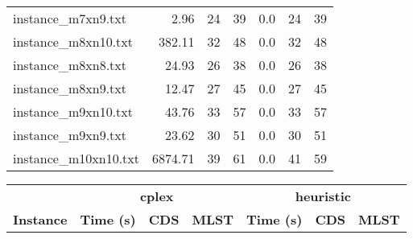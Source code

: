 \documentclass{article}
\begin{document}
\begin{center}
\begin{tabular}{lrrrrrr}
instance\_m7xn9.txt & 2.96 & 24 & 39
 & 0.0 & 24 & 39
\\
instance\_m8xn10.txt & 382.11 & 32 & 48
 & 0.0 & 32 & 48
\\
instance\_m8xn8.txt & 24.93 & 26 & 38
 & 0.0 & 26 & 38
\\
instance\_m8xn9.txt & 12.47 & 27 & 45
 & 0.0 & 27 & 45
\\
instance\_m9xn10.txt & 43.76 & 33 & 57
 & 0.0 & 33 & 57
\\
instance\_m9xn9.txt & 23.62 & 30 & 51
 & 0.0 & 30 & 51
\\
instance\_m10xn10.txt & 6874.71 & 39 & 61
 & 0.0 & 41 & 59
\\
\hline\end{tabular}
\end{center}
\newpage
\begin{center}
\renewcommand{\arraystretch}{1.4}
 \begin{tabular}{lrrrrrr}
	\hline
 & \multicolumn{3}{c}{\textbf{cplex}} & \multicolumn{3}{c}{\textbf{heuristic}}\\
\textbf{Instance}  & \textbf{Time (s)} & \textbf{CDS} & \textbf{MLST}   & \textbf{Time (s)} & \textbf{CDS} & \textbf{MLST}  \\\hline


\end{tabular}
\end{center}
\end{document}
